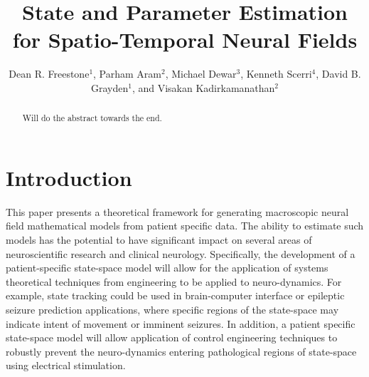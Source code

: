 \documentclass[twocolumn,11pt,a4paper]{article}		%
\begin{document}

\title[State and Parameter Estimation for Spatio-Temporal Neural Fields]{State and Parameter Estimation for Spatio-Temporal Neural Fields}

\author{Dean R. Freestone$^1$, Parham Aram$^2$, Michael Dewar$^3$, Kenneth Scerri$^4$, David B. Grayden$^1$, and Visakan Kadirkamanathan$^2$}

\begin{abstract}
	Will do the abstract towards the end. 
\end{abstract}

\maketitle

\section{Introduction} This paper presents a theoretical framework for generating macroscopic neural field  mathematical models from patient specific data. The ability to estimate such models has the potential to have significant impact on several areas of neuroscientific research and clinical neurology. Specifically, the development of a patient-specific state-space model will allow for the application of systems theoretical techniques from engineering to be applied to neuro-dynamics. For example, state tracking could be used in brain-computer interface or epileptic seizure prediction applications, where specific regions of the state-space may indicate intent of movement or imminent seizures. In addition, a patient specific state-space model will allow application of control engineering techniques to robustly prevent the neuro-dynamics entering pathological regions of state-space using electrical stimulation. 
\end{document}
